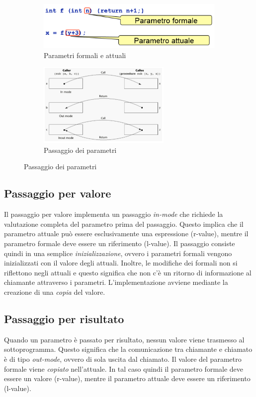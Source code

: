 \documentclass[a4paper,oneside,titlepage]{book}
\begin{document}
\begin{figure}[htp]
	\begin{subfigure}{0.49\textwidth}
		\includegraphics[width=\textwidth, height=\textheight, keepaspectratio]{parametri.png} 
		\caption{Parametri formali e attuali}
	\end{subfigure}
	\hfill
	\begin{subfigure}{0.49\textwidth}
		\centering
		\includegraphics[width=0.7\textwidth, height=0.7\textheight, keepaspectratio]{passaggioPar.png}
		\caption{Passaggio dei parametri}
	\end{subfigure}
\end{figure}

\subsection{Passaggio per valore}
Il passaggio per valore implementa un passaggio \textit{in-mode} che richiede la valutazione completa del parametro prima del passaggio. Questo implica che il parametro attuale può essere esclusivamente una espressione (r-value), mentre il parametro formale deve essere un riferimento (l-value). Il passaggio consiste quindi in una semplice \textit{inizializzazione}, ovvero i parametri formali vengono inizializzati con il valore degli attuali. Inoltre, le modifiche dei formali non si riflettono negli attuali e questo significa che non c'è un ritorno di informazione al chiamante attraverso i parametri. L'implementazione avviene mediante la creazione di una \textit{copia} del valore.

\subsection{Passaggio per risultato}
Quando un parametro è passato per risultato, nessun valore viene trasmesso al sottoprogramma. Questo significa che la comunicazione tra chiamante e chiamato è di tipo \textit{out-mode}, ovvero di sola uscita dal chiamato. Il valore del parametro formale viene \textit{copiato} nell'attuale. In tal caso quindi il parametro formale deve essere un valore (r-value), mentre il parametro attuale deve essere un riferimento (l-value).
\end{document}
